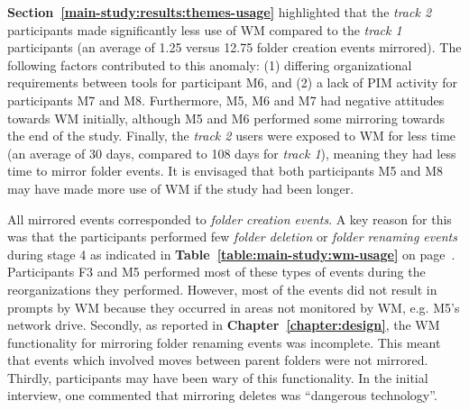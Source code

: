 \textbf{Section~\ref{main-study:results:themes-usage}} highlighted that the \textit{track 2} participants made significantly less use of WM compared to the \textit{track 1} participants (an average of 1.25 versus 12.75 folder creation events mirrored).  The following factors contributed to this anomaly: (1) differing organizational requirements between tools for participant M6, and (2) a lack of PIM activity for participants M7 and M8.  Furthermore, M5, M6 and M7 had negative attitudes towards WM initially, although M5 and M6 performed some mirroring towards the end of the study.   Finally, the \textit{track 2} users were exposed to WM for less time (an average of 30 days, compared to 108 days for \textit{track 1}), meaning they had less time to mirror folder events. It is envisaged that both participants M5 and M8 may have made more use of WM if the study had been longer.

All mirrored events corresponded to \textit{folder creation events}.  A key reason for this was that the participants performed few \textit{folder deletion} or \textit{folder renaming events} during stage 4 as indicated in \textbf{Table~\ref{table:main-study:wm-usage}} on page~\pageref{table:main-study:wm-usage}.  Participants F3 and M5 performed most of these types of events during the reorganizations they performed.  However, most of the events did not result in prompts by WM because they occurred in areas not monitored by WM, e.g. M5's network drive.
Secondly, as reported in \textbf{Chapter~\ref{chapter:design}}, the WM functionality for mirroring folder renaming events was incomplete.  This meant that events which involved moves between parent folders were not mirrored.  Thirdly, participants may have been wary of this functionality.  In the initial interview, one commented that mirroring deletes was ``dangerous technology''.

